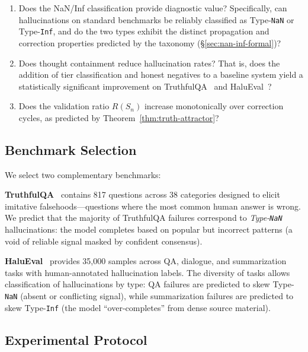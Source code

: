 \documentclass[11pt]{article}
\theoremstyle{definition}
\theoremstyle{remark}
\newcommand{\NaN}{\texttt{NaN}}
\newcommand{\Inf}{\texttt{Inf}}
\begin{document}
\begin{enumerate}
  \item[\textbf{RQ1.}] Does the NaN/Inf classification provide diagnostic
    value?  Specifically, can hallucinations on standard benchmarks be
    reliably classified as Type-\NaN{} or Type-\Inf{}, and do the two types
    exhibit the distinct propagation and correction properties predicted
    by the taxonomy (\S\ref{sec:nan-inf-formal})?
  \item[\textbf{RQ2.}] Does thought containment reduce hallucination rates?
    That is, does the addition of tier classification and honest negatives
    to a baseline system yield a statistically significant improvement on
    TruthfulQA~\cite{lin2022truthfulqa} and HaluEval~\cite{li2023halueval}?
  \item[\textbf{RQ3.}] Does the validation ratio $R(S_n)$ increase
    monotonically over correction cycles, as predicted by
    Theorem~\ref{thm:truth-attractor}?
\end{enumerate}

\subsection{Benchmark Selection}
\label{sec:benchmark-selection}

We select two complementary benchmarks:

\medskip
\noindent\textbf{TruthfulQA}~\cite{lin2022truthfulqa} contains 817 questions
across 38 categories designed to elicit imitative falsehoods---questions where
the most common human answer is wrong.  We predict that the majority of
TruthfulQA failures correspond to \emph{Type-\NaN{}} hallucinations: the model
completes based on popular but incorrect patterns (a void of reliable signal
masked by confident consensus).

\medskip
\noindent\textbf{HaluEval}~\cite{li2023halueval} provides 35,000 samples
across QA, dialogue, and summarization tasks with human-annotated hallucination
labels.  The diversity of tasks allows classification of hallucinations by
type: QA failures are predicted to skew Type-\NaN{} (absent or conflicting
signal), while summarization failures are predicted to skew Type-\Inf{}
(the model ``over-completes'' from dense source material).

\subsection{Experimental Protocol}
\label{sec:experimental-protocol}
\end{document}
